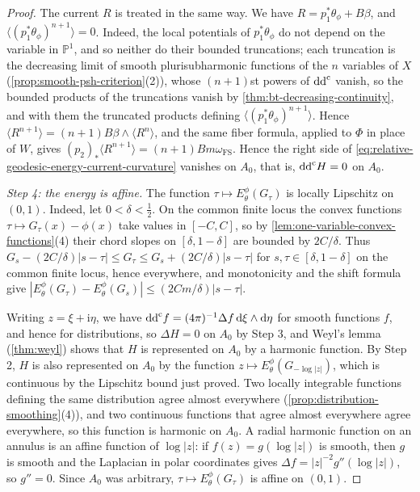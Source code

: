 \begin{proof}
The current $R$ is treated in the same way. We have $R=p_1^*\theta_\phi+B\beta$, and $\langle(p_1^*\theta_\phi)^{n+1}\rangle=0$. Indeed, the local potentials of $p_1^*\theta_\phi$ do not depend on the variable in $\mathbb P^1$, and so neither do their bounded truncations; each truncation is the decreasing limit of smooth plurisubharmonic functions of the $n$ variables of $X$ (\cref{prop:smooth-psh-criterion}(2)), whose $(n+1)$st powers of $\mathrm{dd}^{\mathrm{c}}$ vanish, so the bounded products of the truncations vanish by \cref{thm:bt-decreasing-continuity}, and with them the truncated products defining $\langle(p_1^*\theta_\phi)^{n+1}\rangle$. Hence $\langle R^{n+1}\rangle=(n+1)B\beta\wedge\langle R^n\rangle$, and the same fiber formula, applied to $\Phi$ in place of $W$, gives $(p_2)_*\langle R^{n+1}\rangle=(n+1)Bm\omega_{\mathrm{FS}}$. Hence the right side of \eqref{eq:relative-geodesic-energy-current-curvature} vanishes on $A_0$, that is, $\mathrm{dd}^{\mathrm{c}} H=0$ on $A_0$.

\emph{Step 4: the energy is affine.} The function $\tau\mapsto E_\theta^\phi(G_\tau)$ is locally Lipschitz on $(0,1)$. Indeed, let $0<\delta<\frac12$. On the common finite locus the convex functions $\tau\mapsto G_\tau(x)-\phi(x)$ take values in $[-C,C]$, so by \cref{lem:one-variable-convex-functions}(4) their chord slopes on $[\delta,1-\delta]$ are bounded by $2C/\delta$. Thus $G_s-(2C/\delta)|s-\tau|\leq G_\tau\leq G_s+(2C/\delta)|s-\tau|$ for $s,\tau\in[\delta,1-\delta]$ on the common finite locus, hence everywhere, and monotonicity and the shift formula give $|E_\theta^\phi(G_\tau)-E_\theta^\phi(G_s)|\leq(2Cm/\delta)|s-\tau|$.

Writing $z=\xi+\mathrm i\eta$, we have $\mathrm{dd}^{\mathrm{c}} f=(4\pi)^{-1}\Delta f\,\mathrm d\xi\wedge\mathrm d\eta$ for smooth functions $f$, and hence for distributions, so $\Delta H=0$ on $A_0$ by Step 3, and Weyl's lemma (\cref{thm:weyl}) shows that $H$ is represented on $A_0$ by a harmonic function. By Step 2, $H$ is also represented on $A_0$ by the function $z\mapsto E_\theta^\phi(G_{-\log|z|})$, which is continuous by the Lipschitz bound just proved. Two locally integrable functions defining the same distribution agree almost everywhere (\cref{prop:distribution-smoothing}(4)), and two continuous functions that agree almost everywhere agree everywhere, so this function is harmonic on $A_0$. A radial harmonic function on an annulus is an affine function of $\log|z|$: if $f(z)=g(\log|z|)$ is smooth, then $g$ is smooth and the Laplacian in polar coordinates gives $\Delta f=|z|^{-2}g''(\log|z|)$, so $g''=0$. Since $A_0$ was arbitrary, $\tau\mapsto E_\theta^\phi(G_\tau)$ is affine on $(0,1)$.


\end{proof}
